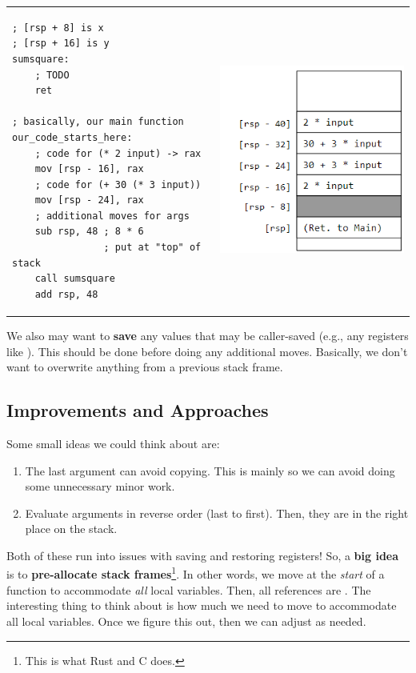 \documentclass[letterpaper]{article}
\begin{document}
\begin{center}
    \begin{tabular}{p{3in}|p{3in}}
        \begin{verbatim}
; [rsp + 8] is x 
; [rsp + 16] is y
sumsquare:
    ; TODO 
    ret 

; basically, our main function 
our_code_starts_here:
    ; code for (* 2 input) -> rax 
    mov [rsp - 16], rax 
    ; code for (+ 30 (* 3 input))
    mov [rsp - 24], rax
    ; additional moves for args 
    sub rsp, 48 ; 8 * 6
                ; put at "top" of stack
    call sumsquare
    add rsp, 48\end{verbatim}
        & \begin{center}
            \includegraphics[scale=0.6]{../assets/sumsq_arg_order2.png}
        \end{center}
    \end{tabular}
\end{center}
We also may want to \textbf{save} any values that may be caller-saved (e.g., any registers like ). This should be done before doing any additional moves. Basically, we don't want to overwrite anything from a previous stack frame.

\subsection{Improvements and Approaches}
Some small ideas we could think about are: 
\begin{enumerate}
    \item The last argument can avoid copying. This is mainly so we can avoid doing some unnecessary minor work. 
    \item Evaluate arguments in reverse order (last to first). Then, they are in the right place on the stack. 
\end{enumerate}
Both of these run into issues with saving and restoring registers! So, a \textbf{big idea} is to \textbf{pre-allocate stack frames}\footnote{This is what Rust and C does.}. In other words, we move  at the \emph{start} of a function to accommodate \emph{all} local variables. Then, all references are \code{[rsp + \_\_\_]}. The interesting thing to think about is how much we need to move  to accommodate all local variables. Once we figure this out, then we can adjust  as needed. 
\end{document}
